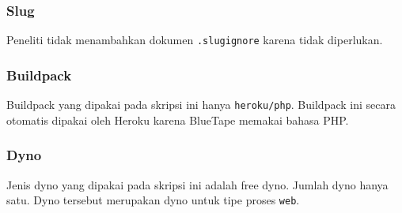 	\subsubsection{Slug}
		Peneliti tidak menambahkan dokumen \texttt{.slugignore} karena tidak diperlukan.
		
	\subsubsection{Buildpack}
		Buildpack yang dipakai pada skripsi ini hanya \texttt{heroku/php}. Buildpack ini secara otomatis dipakai oleh Heroku karena BlueTape memakai bahasa PHP.
		
	\subsubsection{Dyno}
		Jenis dyno yang dipakai pada skripsi ini adalah free dyno. Jumlah dyno hanya satu. Dyno tersebut merupakan dyno untuk tipe proses \texttt{web}.
		
